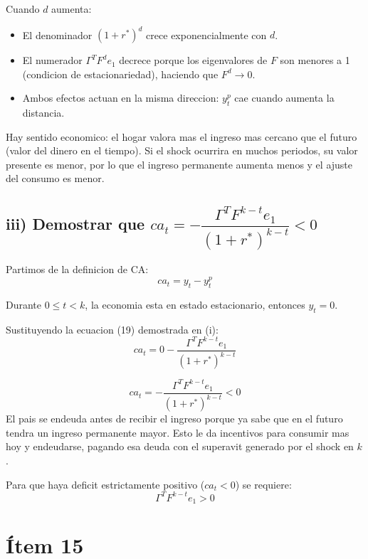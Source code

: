 Cuando $d$ aumenta:
\begin{itemize}
    \item El denominador $(1+r^*)^d$ crece exponencialmente con $d$.
    \item El numerador $\Gamma^T F^d e_1$ decrece porque los eigenvalores de $F$ son menores a 1 (condicion de estacionariedad), haciendo que $F^d \to 0$.
    \item Ambos efectos actuan en la misma direccion: $y_t^p$ cae cuando aumenta la distancia.
\end{itemize}

\begin{interpretacion}
Hay sentido economico: el hogar valora mas el ingreso mas cercano que el futuro (valor del dinero en el tiempo). Si el shock ocurrira en muchos periodos, su valor presente es menor, por lo que el ingreso permanente aumenta menos y el ajuste del consumo es menor.
\end{interpretacion}

\subsection*{iii) Demostrar que $ca_t = -\dfrac{\Gamma^T F^{k-t} e_1}{(1+r^*)^{k-t}} < 0$}

Partimos de la definicion de CA:
\[
    ca_t = y_t - y_t^p
\]

Durante $0 \leq t < k$, la economia esta en estado estacionario, entonces $y_t = 0$.

Sustituyendo la ecuacion (19) demostrada en (i):
\[
    ca_t = 0 - \frac{\Gamma^T F^{k-t} e_1}{(1+r^*)^{k-t}}
\]

\begin{resultado}
\[
    ca_t = -\frac{\Gamma^T F^{k-t} e_1}{(1+r^*)^{k-t}} < 0
\]
El pais se endeuda antes de recibir el ingreso porque ya sabe que en el futuro tendra un ingreso permanente mayor. Esto le da incentivos para consumir mas hoy y endeudarse, pagando esa deuda con el superavit generado por el shock en $k$.
\end{resultado}

Para que haya deficit estrictamente positivo ($ca_t < 0$) se requiere:
\[
    \Gamma^T F^{k-t} e_1 > 0
\]

\section*{Ítem 15}

